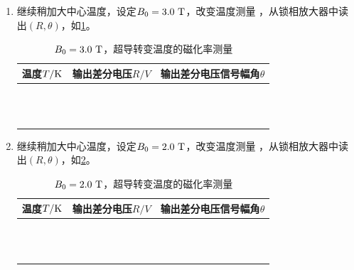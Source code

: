 \documentclass[11pt,a4paper]{ctexart}
\newcommand{\unit}[1]{\rm \ #1}
\begin{document}
\begin{enumerate}
\begin{table}[H]
\begin{tabular}{|p{32mm}|p{32mm}|p{32mm}|}
  &  &\\ \hline
  \end{tabular}
  \end{table}
  \item
继续稍加大中心温度，设定$B_0 = 3.0\unit{T}$，改变温度测量 ，从锁相放大器中读出$(R,\theta)$，如\cref{table7}。
  \begin{table}[H]
\centering
\caption{$B_0 = 3.0\unit{T}$，超导转变温度的磁化率测量\label{table7}}
\begin{tabular}{|p{32mm}|p{32mm}|p{32mm}|}
\hline
温度$T/{\rm K}$ & 输出差分电压$R/{V}$ & 输出差分电压信号幅角$\theta$ \\ \hline
& & \\ \hline
  & & \\ \hline
& & \\ \hline
   & & \\ \hline
    & & \\ \hline
 & & \\ \hline
  &  &\\ \hline
  &  &\\ \hline
  &  &\\ \hline
  &  &\\ \hline
  &  &\\ \hline
  &  &\\ \hline
  \end{tabular}
  \end{table}
  \item
继续稍加大中心温度，设定$B_0 = 2.0\unit{T}$，改变温度测量 ，从锁相放大器中读出$(R,\theta)$，如\cref{table8}。
  \begin{table}[H]
\centering
\caption{$B_0 = 2.0\unit{T}$，超导转变温度的磁化率测量\label{table8}}
\begin{tabular}{|p{32mm}|p{32mm}|p{32mm}|}
\hline
温度$T/{\rm K}$ & 输出差分电压$R/{V}$ & 输出差分电压信号幅角$\theta$ \\ \hline
& & \\ \hline
  & & \\ \hline
& & \\ \hline
   & & \\ \hline
    & & \\ \hline
 & & \\ \hline
  &  &\\ \hline
  &  &\\ \hline
  &  &\\ \hline
  &  &\\ \hline
  &  &\\ \hline
  &  &\\ \hline

\end{tabular}
\end{table}
\end{enumerate}
\end{document}
